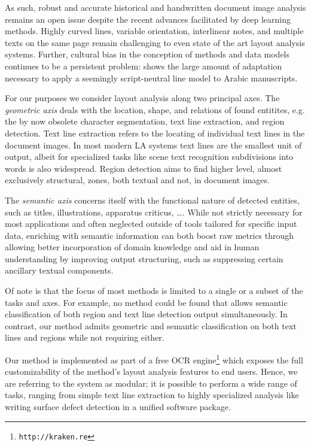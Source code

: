 As such, robust and accurate historical and handwritten document image analysis
remains an open issue despite the recent advances facilitated by deep learning
methods. Highly curved lines, variable orientation, interlinear notes, and
multiple texts on the same page remain challenging to even state of the art
layout analysis systems. Further, cultural bias in the conception of methods
and data models continues to be a persistent problem: \cite{kiessling2019badam}
shows the large amount of adaptation necessary to apply a seemingly
script-neutral line model to Arabic manuscripts.

For our purposes we consider layout analysis along two principal axes. The
\emph{geometric axis} deals with the location, shape, and relations of found
entitites, e.g. the by now obsolete character segmentation, text line
extraction, and region detection. Text line extraction refers to the locating
of individual text lines in the document images. In most modern LA systems text
lines are the smallest unit of output, albeit for specialized tasks like scene
text recognition subdivisions into words is also widespread. Region detection
aims to find higher level, almost exclusively structural, zones, both textual
and not, in document images. 

The \emph{semantic axis} concerns itself with the functional nature of detected
entities, such as titles, illustrations, apparatus criticus, \dots. While not
strictly necessary for most applications and often neglected outside of tools
tailored for specific input data, enriching with semantic information can both
boost raw metrics through allowing better incorporation of domain knowledge and
aid in human understanding by improving output structuring, such as suppressing
certain ancillary textual components.

Of note is that the focus of most methods is limited to a single or a subset of
the tasks and axes. For example, no method could be found that allows semantic
classification of both region and text line detection output simultaneously. In
contrast, our method admits geometric and semantic classification on both text
lines and regions while not requiring either.

Our method is implemented as part of a free OCR engine\footnote{\texttt{http://kraken.re}}
which exposes the full customizability of the method's layout analysis features
to end users.  Hence, we are referring to the system as modular; it is possible
to perform a wide range of tasks, ranging from simple text line extraction to
highly specialized analysis like writing surface defect detection in a unified
software package.

